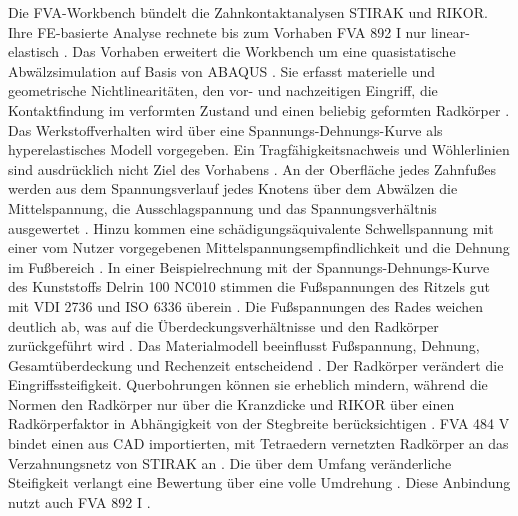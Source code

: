 Die FVA-Workbench bündelt die Zahnkontaktanalysen STIRAK und RIKOR. Ihre FE-basierte Analyse rechnete bis zum Vorhaben FVA 892 I nur linear-elastisch \cite[S.~1 bis 2]{FVA892-I}. Das Vorhaben erweitert die Workbench um eine quasistatische Abwälzsimulation auf Basis von ABAQUS \cite[S.~4]{FVA892-I}. Sie erfasst materielle und geometrische Nichtlinearitäten, den vor- und nachzeitigen Eingriff, die Kontaktfindung im verformten Zustand und einen beliebig geformten Radkörper \cite[S.~4]{FVA892-I}. Das Werkstoffverhalten wird über eine Spannungs-Dehnungs-Kurve als hyperelastisches Modell vorgegeben. Ein Tragfähigkeitsnachweis und Wöhlerlinien sind ausdrücklich nicht Ziel des Vorhabens \cite[S.~5]{FVA892-I}. An der Oberfläche jedes Zahnfußes werden aus dem Spannungsverlauf jedes Knotens über dem Abwälzen die Mittelspannung, die Ausschlagspannung und das Spannungsverhältnis ausgewertet \cite[S.~19]{FVA892-I}. Hinzu kommen eine schädigungsäquivalente Schwellspannung mit einer vom Nutzer vorgegebenen Mittelspannungsempfindlichkeit und die Dehnung im Fußbereich \cite[S.~19 und 21]{FVA892-I}. In einer Beispielrechnung mit der Spannungs-Dehnungs-Kurve des Kunststoffs Delrin 100 NC010 stimmen die Fußspannungen des Ritzels gut mit VDI 2736 und ISO 6336 überein \cite[S.~27 bis 28]{FVA892-I}. Die Fußspannungen des Rades weichen deutlich ab, was auf die Überdeckungsverhältnisse und den Radkörper zurückgeführt wird \cite[S.~29 bis 31]{FVA892-I}. Das Materialmodell beeinflusst Fußspannung, Dehnung, Gesamtüberdeckung und Rechenzeit entscheidend \cite[S.~31]{FVA892-I}. Der Radkörper verändert die Eingriffssteifigkeit. Querbohrungen können sie erheblich mindern, während die Normen den Radkörper nur über die Kranzdicke und RIKOR über einen Radkörperfaktor in Abhängigkeit von der Stegbreite berücksichtigen \cite[S.~2 bis 3]{FVA484-V}. FVA 484 V bindet einen aus CAD importierten, mit Tetraedern vernetzten Radkörper an das Verzahnungsnetz von STIRAK an \cite[S.~33]{FVA484-V}. Die über dem Umfang veränderliche Steifigkeit verlangt eine Bewertung über eine volle Umdrehung \cite[S.~34]{FVA484-V}. Diese Anbindung nutzt auch FVA 892 I \cite[S.~4]{FVA892-I}.


